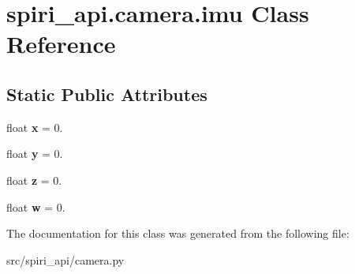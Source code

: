 \hypertarget{classspiri__api_1_1camera_1_1imu}{\section{spiri\-\_\-api.\-camera.\-imu \-Class \-Reference}
\label{classspiri__api_1_1camera_1_1imu}
}
\subsection*{\-Static \-Public \-Attributes}
\begin{DoxyCompactItemize}
\item 
\hypertarget{classspiri__api_1_1camera_1_1imu_a4eea620af8f1cc0bb7f124668a441c65}{float {\bfseries x} = 0.}\label{classspiri__api_1_1camera_1_1imu_a4eea620af8f1cc0bb7f124668a441c65}

\item 
\hypertarget{classspiri__api_1_1camera_1_1imu_adebde119fe935f2690626efa0fa9d7f0}{float {\bfseries y} = 0.}\label{classspiri__api_1_1camera_1_1imu_adebde119fe935f2690626efa0fa9d7f0}

\item 
\hypertarget{classspiri__api_1_1camera_1_1imu_a56438c9b1f8501ced06b0d5375b3217d}{float {\bfseries z} = 0.}\label{classspiri__api_1_1camera_1_1imu_a56438c9b1f8501ced06b0d5375b3217d}

\item 
\hypertarget{classspiri__api_1_1camera_1_1imu_a76805d46ac461f16d978b41b0365ec81}{float {\bfseries w} = 0.}\label{classspiri__api_1_1camera_1_1imu_a76805d46ac461f16d978b41b0365ec81}

\end{DoxyCompactItemize}


\-The documentation for this class was generated from the following file\-:\begin{DoxyCompactItemize}
\item 
src/spiri\-\_\-api/camera.\-py\end{DoxyCompactItemize}
